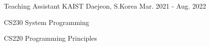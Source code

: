 

\begin{cventries}

  \cventry
    {Teaching Assistant} %
    {KAIST} %
    {Daejeon, S.Korea} %
    {Mar. 2021 - Aug. 2022} %
    {
      \begin{cvitems} %
        \item {CS230 System Programming}
        \item {CS220 Programming Principles}
      \end{cvitems}
    }


\end{cventries}
